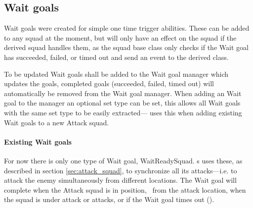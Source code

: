 \subsection{Wait goals}
\label{sec:wait_goals}
Wait goals were created for simple one time trigger abilities. These can be added to any squad at
the moment, but will only have an effect on the squad if the derived squad handles them, as the
squad base class only checks if the Wait goal has succeeded, failed, or timed out and send an event
to the derived class.

To be updated Wait goals shall be added to the Wait goal manager which updates the goals, completed
goals (succeeded, failed, timed out) will automatically be removed from the Wait goal manager. When
adding an Wait goal to the manager an optional set type can be set, this allows all Wait goals with
the same set type to be easily extracted— uses this when adding
existing Wait goals to a new Attack squad.

\paragraph{Existing Wait goals}
For now there is only one type of Wait goal, WaitReadySquad. s uses these,
as described in section \ref{sec:attack_squad}, to synchronize all its attacks—i.e. to attack the
enemy simultaneously from different locations. The Wait goal will complete when the Attack squad is
in position, \squadAttackWaitingPositionDistanceFromGoal~from the attack location, when the squad is
under attack or attacks, or if the Wait goal times out (\attackCoordinatorWaitGoalTimeout).
